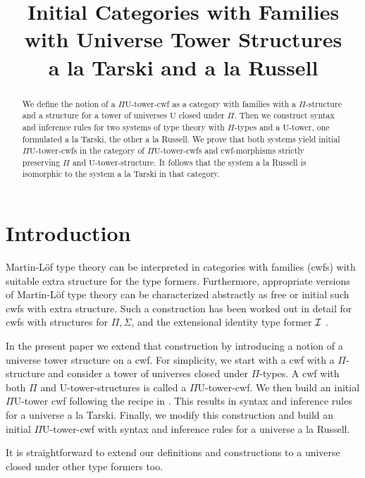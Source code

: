 \documentclass{lmcs}
\title{Initial Categories with Families\\with Universe Tower Structures\\ 
a la Tarski and a la Russell}
\def\UU{\mathrm{U}}
\begin{document}
\maketitle

\begin{abstract}
We define the notion of a $\Pi\UU$-tower-cwf as a category with families with a $\Pi$-structure and a structure for a tower of universes $\UU$ closed under $\Pi$. Then we construct syntax and inference rules for two systems of type theory with $\Pi$-types and a $\UU$-tower, one formulated a la Tarski, the other a la Russell. We prove that both systems yield initial $\Pi\UU$-tower-cwfs in the category of $\Pi\UU$-tower-cwfs and cwf-morphisms strictly preserving $\Pi$ and $\UU$-tower-structure. It follows that the system a la Russell is isomorphic to the system a la Tarski in that category.
 \end{abstract}

\allowdisplaybreaks
\section{Introduction}

Martin-Löf type theory can be interpreted in categories with families (cwfs) with suitable extra structure for the type formers. Furthermore, appropriate versions of Martin-Löf type theory can be characterized  abstractly as free or initial such cwfs with extra structure. Such a construction has been worked out in detail for cwfs with structures for $\Pi, \Sigma$, and the extensional identity type former ${\mathcal I}$ \cite{castellan:tlca2015}. 

In the present paper we extend that construction by introducing a notion of a universe tower structure on a cwf. For simplicity, we start with a cwf with a $\Pi$-structure and consider a tower of universes closed under $\Pi$-types. A cwf with both $\Pi$ and $\UU$-tower-structures is called a $\Pi\UU$-tower-cwf. We then build an initial  $\Pi\UU$-tower cwf  following the recipe in \cite{castellan:tlca2015}. This results in syntax and inference rules for a universe a la Tarski. Finally, we modify this construction and build an initial  $\Pi\UU$-tower-cwf  with syntax and inference rules for a universe a la Russell.

It is straightforward to extend our definitions and constructions to a universe closed under other type formers too.
\end{document}
